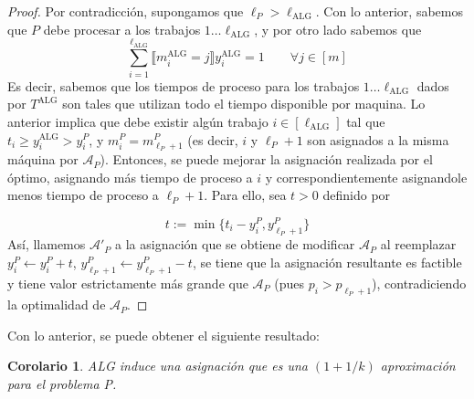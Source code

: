 \documentclass[10pt]{article}
\theoremstyle{plain}
\newtheorem{cor}{Corolario}
\theoremstyle{definition}
\begin{document}
\begin{proof}
Por contradicción, supongamos que $\ell_P > \ell_{\text{ALG}}$. Con lo anterior, sabemos que $P$ debe procesar a los trabajos $1\ldots \ell_{\text{ALG}}$, y por otro lado sabemos que 
$$
\sum_{i = 1}^{\ell_{\text{ALG}}} \llbracket m^{\text{ALG}}_i = j\rrbracket y^{\text{ALG}}_i = 1 \qquad \forall j \in [m] 
$$  
Es decir, sabemos que los tiempos de proceso para los trabajos $1\ldots \ell_{\text{ALG}}$ dados por $T^{\text{ALG}}$ son tales que utilizan todo el tiempo disponible por maquina. Lo anterior implica que debe existir algún trabajo $i \in [\ell_{\text{ALG}}]$ tal que $t_i \geq y^{\text{ALG}}_i > y^P_i$, y $m^P_i = m^P_{\ell_P+1}$ (es decir, $i$ y $\ell_P + 1$ son asignados a la misma m\'aquina por $\mathcal{A}_P$). Entonces, se puede mejorar la asignaci\'on realizada por el \'optimo, asignando m\'as tiempo de proceso a $i$ y correspondientemente asignandole menos tiempo de proceso a $\ell_P + 1$. Para ello, sea $t>0$ definido por

$$
t := \min\{t_i-y^P_i,y^P_{\ell_P + 1}\}
$$
Así, llamemos $\mathcal{A}'_P$ a la asignaci\'on que se obtiene de modificar $\mathcal{A}_P$ al reemplazar $y^P_i \gets y^P_i+t$, $y^P_{\ell_P +1} \gets y^P_{\ell_P +1}-t$, se tiene que la asignación resultante es factible y tiene valor estrictamente más grande que $\mathcal{A}_P$ (pues $p_i > p_{\ell_P + 1}$), contradiciendo la optimalidad de $\mathcal{A}_P$. 
\end{proof}

Con lo anterior, se puede obtener el siguiente resultado:
\begin{cor}
\label{cor:appPchico}
ALG induce una asignaci\'on que es una $(1+1/k)$ aproximación para el problema P.
\end{cor}
\end{document}
